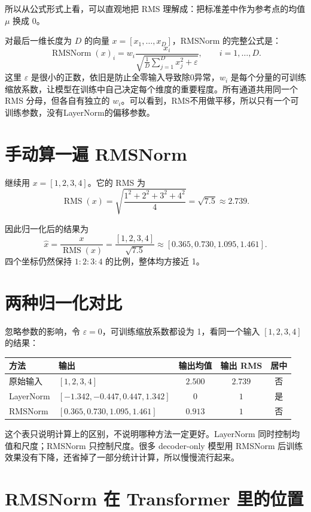\documentclass[UTF8,11pt,a4paper]{ctexart}
\begin{document}
所以从公式形式上看，可以直观地把 RMS 理解成：把标准差中作为参考点的均值 $\mu$ 换成 $0$。

对最后一维长度为 $D$ 的向量 $x=[x_1,\ldots,x_D]$，RMSNorm 的完整公式是：
\[
\operatorname{RMSNorm}(x)_i
=w_i\frac{x_i}
{\sqrt{\frac{1}{D}\sum_{j=1}^{D}x_j^2+\varepsilon}},
\qquad i=1,\ldots,D.
\]
这里 $\varepsilon$ 是很小的正数，依旧是防止全零输入导致除0异常，$w_i$ 是每个分量的可训练缩放系数，让模型在训练中自己决定每个维度的重要程度。所有通道共用同一个 RMS 分母，但各自有独立的 $w_i$。可以看到，RMS不用做平移，所以只有一个可训练参数，没有LayerNorm的偏移参数。

\section{手动算一遍 RMSNorm}

继续用 $x=[1,2,3,4]$。它的 RMS 为
\[
\operatorname{RMS}(x)
=
\sqrt{\frac{1^2+2^2+3^2+4^2}{4}}
=
\sqrt{7.5}
\approx2.739.
\]

因此归一化后的结果为
\[
\widehat{x}
=
\frac{x}{\operatorname{RMS}(x)}
=
\frac{[1,2,3,4]}{\sqrt{7.5}}
\approx
[0.365,0.730,1.095,1.461].
\]
四个坐标仍然保持 $1:2:3:4$ 的比例，整体均方接近 1。


\section{两种归一化对比}

忽略参数的影响，令 $\varepsilon=0$，可训练缩放系数都设为 1，看同一个输入 $[1,2,3,4]$ 的结果：

\begin{center}
\small
\begin{tabular}{p{2.1cm}p{5.1cm}ccc}
\toprule
方法 & 输出 & 输出均值 & 输出 RMS & 居中\\
\midrule
原始输入 & $[1,2,3,4]$ & $2.500$ & $2.739$ & 否\\
LayerNorm & $[-1.342,-0.447,0.447,1.342]$ & $0$ & $1$ & 是\\
RMSNorm & $[0.365,0.730,1.095,1.461]$ & $0.913$ & $1$ & 否\\
\bottomrule
\end{tabular}
\end{center}

这个表只说明计算上的区别，不说明哪种方法一定更好。LayerNorm 同时控制均值和尺度；RMSNorm 只控制尺度。很多 decoder-only 模型用 RMSNorm 后训练效果没有下降，还省掉了一部分统计计算，所以慢慢流行起来。

\section{RMSNorm 在 Transformer 里的位置}
\end{document}
